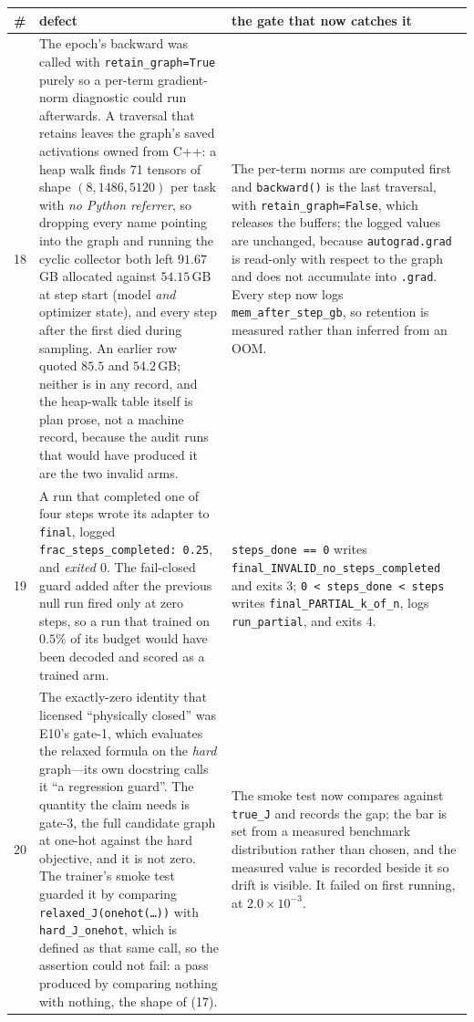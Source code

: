 \documentclass{article}
\begin{document}
\begin{table}[p]
\centering
\small\sloppy
\setlength{\tabcolsep}{4pt}
\begin{tabular}{@{}p{0.6cm}p{7.3cm}p{7.3cm}@{}}
\toprule
\# & defect & the gate that now catches it \\
\midrule
18 & The epoch's backward was called with \texttt{retain\_graph=True} purely so a per-term gradient-norm diagnostic could run afterwards.  A traversal that retains leaves the graph's saved activations owned from C++: a heap walk finds 71 tensors of shape $(8, 1486, 5120)$ per task with \emph{no Python referrer}, so dropping every name pointing into the graph and running the cyclic collector both left $91.67$\,GB allocated against $54.15$\,GB at step start (model \emph{and} optimizer state), and every step after the first died during sampling.  An earlier row quoted $85.5$ and $54.2$\,GB; neither is in any record, and the heap-walk table itself is plan prose, not a machine record, because the audit runs that would have produced it are the two invalid arms. & The per-term norms are computed first and \texttt{backward()} is the last traversal, with \texttt{retain\_graph=False}, which releases the buffers; the logged values are unchanged, because \texttt{autograd.grad} is read-only with respect to the graph and does not accumulate into \texttt{.grad}.  Every step now logs \texttt{mem\_after\_step\_gb}, so retention is measured rather than inferred from an OOM. \\
19 & A run that completed one of four steps wrote its adapter to \texttt{final}, logged \texttt{frac\_steps\_completed: 0.25}, and \emph{exited $0$}.  The fail-closed guard added after the previous null run fired only at zero steps, so a run that trained on $0.5\%$ of its budget would have been decoded and scored as a trained arm. & \texttt{steps\_done == 0} writes \texttt{final\_INVALID\_no\_steps\_completed} and exits 3; \texttt{0 < steps\_done < steps} writes \texttt{final\_PARTIAL\_k\_of\_n}, logs \texttt{run\_partial}, and exits 4. \\
20 & The exactly-zero identity that licensed ``physically closed'' was E10's gate-1, which evaluates the relaxed formula on the \emph{hard} graph---its own docstring calls it ``a regression guard''.  The quantity the claim needs is gate-3, the full candidate graph at one-hot against the hard objective, and it is not zero.  The trainer's smoke test guarded it by comparing \texttt{relaxed\_J(onehot(\dots))} with \texttt{hard\_J\_onehot}, which is defined as that same call, so the assertion could not fail: a pass produced by comparing nothing with nothing, the shape of (17). & The smoke test now compares against \texttt{true\_J} and records the gap; the bar is set from a measured benchmark distribution rather than chosen, and the measured value is recorded beside it so drift is visible.  It failed on first running, at $2.0\times10^{-3}$. \\

\end{tabular}
\end{table}
\end{document}
